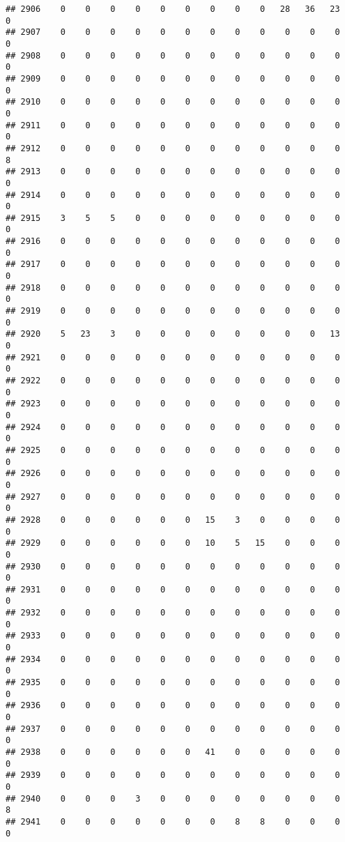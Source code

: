 \documentclass[]{article}
\begin{document}
\begin{verbatim}
## 2906    0    0    0    0    0    0    0    0    0   28   36   23    0
## 2907    0    0    0    0    0    0    0    0    0    0    0    0    0
## 2908    0    0    0    0    0    0    0    0    0    0    0    0    0
## 2909    0    0    0    0    0    0    0    0    0    0    0    0    0
## 2910    0    0    0    0    0    0    0    0    0    0    0    0    0
## 2911    0    0    0    0    0    0    0    0    0    0    0    0    0
## 2912    0    0    0    0    0    0    0    0    0    0    0    0    8
## 2913    0    0    0    0    0    0    0    0    0    0    0    0    0
## 2914    0    0    0    0    0    0    0    0    0    0    0    0    0
## 2915    3    5    5    0    0    0    0    0    0    0    0    0    0
## 2916    0    0    0    0    0    0    0    0    0    0    0    0    0
## 2917    0    0    0    0    0    0    0    0    0    0    0    0    0
## 2918    0    0    0    0    0    0    0    0    0    0    0    0    0
## 2919    0    0    0    0    0    0    0    0    0    0    0    0    0
## 2920    5   23    3    0    0    0    0    0    0    0    0   13    0
## 2921    0    0    0    0    0    0    0    0    0    0    0    0    0
## 2922    0    0    0    0    0    0    0    0    0    0    0    0    0
## 2923    0    0    0    0    0    0    0    0    0    0    0    0    0
## 2924    0    0    0    0    0    0    0    0    0    0    0    0    0
## 2925    0    0    0    0    0    0    0    0    0    0    0    0    0
## 2926    0    0    0    0    0    0    0    0    0    0    0    0    0
## 2927    0    0    0    0    0    0    0    0    0    0    0    0    0
## 2928    0    0    0    0    0    0   15    3    0    0    0    0    0
## 2929    0    0    0    0    0    0   10    5   15    0    0    0    0
## 2930    0    0    0    0    0    0    0    0    0    0    0    0    0
## 2931    0    0    0    0    0    0    0    0    0    0    0    0    0
## 2932    0    0    0    0    0    0    0    0    0    0    0    0    0
## 2933    0    0    0    0    0    0    0    0    0    0    0    0    0
## 2934    0    0    0    0    0    0    0    0    0    0    0    0    0
## 2935    0    0    0    0    0    0    0    0    0    0    0    0    0
## 2936    0    0    0    0    0    0    0    0    0    0    0    0    0
## 2937    0    0    0    0    0    0    0    0    0    0    0    0    0
## 2938    0    0    0    0    0    0   41    0    0    0    0    0    0
## 2939    0    0    0    0    0    0    0    0    0    0    0    0    0
## 2940    0    0    0    3    0    0    0    0    0    0    0    0    8
## 2941    0    0    0    0    0    0    0    8    8    0    0    0    0

\end{verbatim}
\end{document}
